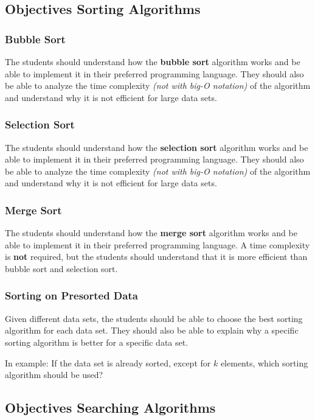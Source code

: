 \documentclass[10pt, oneside]{article}
\theoremstyle{remark}
\begin{document}
\subsection{Objectives Sorting Algorithms}

\subsubsection{Bubble Sort}
The students should understand how the \textbf{bubble sort} algorithm works and be able to implement it in their preferred programming language. They should also be able to analyze the time complexity \textit{(not with big-O notation)} of the algorithm and understand why it is not efficient for large data sets.

\subsubsection{Selection Sort}
The students should understand how the \textbf{selection sort} algorithm works and be able to implement it in their preferred programming language. They should also be able to analyze the time complexity \textit{(not with big-O notation)} of the algorithm and understand why it is not efficient for large data sets.

\subsubsection{Merge Sort}
The students should understand how the \textbf{merge sort} algorithm works and be able to implement it in their preferred programming language. A time complexity is \textbf{not} required, but the students should understand that it is more efficient than bubble sort and selection sort.

\subsubsection{Sorting on Presorted Data}
Given different data sets, the students should be able to choose the best sorting algorithm for each data set. They should also be able to explain why a specific sorting algorithm is better for a specific data set.

In example: If the data set is already sorted, except for $k$ elements, which sorting algorithm should be used?

\subsection{Objectives Searching Algorithms}
\end{document}
